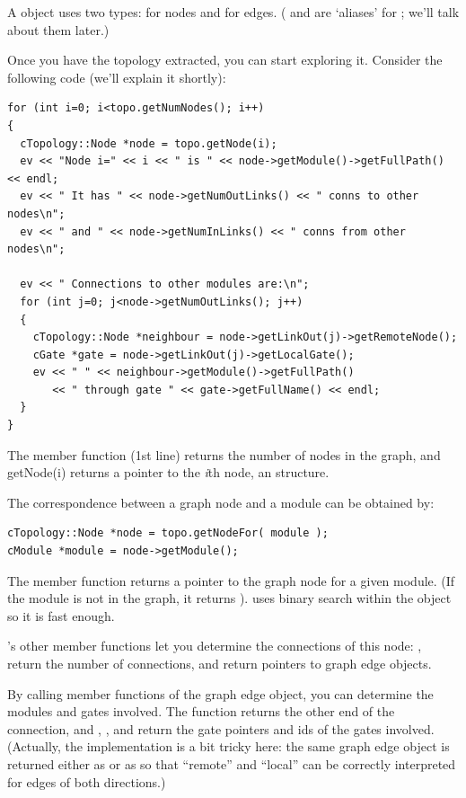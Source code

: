 A  object uses two types:  for
nodes and  for edges. ( and
 are `aliases' for ; we'll
talk about them later.)

Once you have the topology extracted, you can start exploring
it. Consider the following code (we'll explain it shortly):

\begin{verbatim}
for (int i=0; i<topo.getNumNodes(); i++)
{
  cTopology::Node *node = topo.getNode(i);
  ev << "Node i=" << i << " is " << node->getModule()->getFullPath() << endl;
  ev << " It has " << node->getNumOutLinks() << " conns to other nodes\n";
  ev << " and " << node->getNumInLinks() << " conns from other nodes\n";

  ev << " Connections to other modules are:\n";
  for (int j=0; j<node->getNumOutLinks(); j++)
  {
    cTopology::Node *neighbour = node->getLinkOut(j)->getRemoteNode();
    cGate *gate = node->getLinkOut(j)->getLocalGate();
    ev << " " << neighbour->getModule()->getFullPath()
       << " through gate " << gate->getFullName() << endl;
  }
}
\end{verbatim}

The  member function (1st line) returns the number of
nodes in the graph, and getNode(i) returns a pointer to the \textit{i}th
node, an  structure.


The correspondence between a graph node and a module can be obtained
by:

\begin{verbatim}
cTopology::Node *node = topo.getNodeFor( module );
cModule *module = node->getModule();
\end{verbatim}


The  member function returns a pointer to the graph
node for a given module. (If the module is not in the graph, it
returns ).  uses binary search within the
 object so it is fast enough.


's other member functions let you determine the
connections of this node: ,  return
the number of connections,  and
 return pointers to graph edge objects.


By calling member functions of the graph edge object, you can
determine the modules and gates involved. The 
function returns the other end of the connection, and
, ,  and
 return the gate pointers and ids of the gates
involved. (Actually, the implementation is a bit tricky here: the same
graph edge object  is returned either as
 or as  so that ``remote''
and ``local'' can be correctly interpreted for edges of both
directions.)





